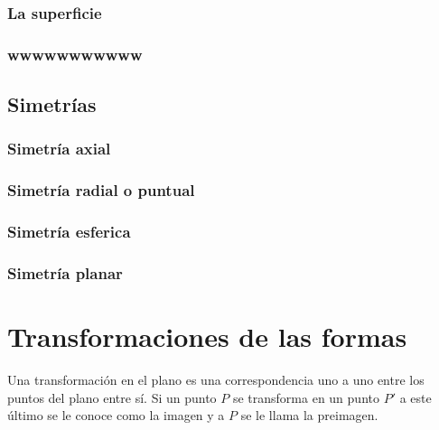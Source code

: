 \documentclass[16pt,]{krantz}
\theoremstyle{definition}
\theoremstyle{definition}
\theoremstyle{definition}
\theoremstyle{definition}
\theoremstyle{remark}
\begin{document}
\hypertarget{la-superficie}{%
\subsection{La superficie}\label{la-superficie}}

\hypertarget{wwwwwwwwwww}{%
\subsection{wwwwwwwwwww}\label{wwwwwwwwwww}}

\hypertarget{simetruxedas}{%
\section{Simetrías}\label{simetruxedas}}

\hypertarget{simetruxeda-axial}{%
\subsection{Simetría axial}\label{simetruxeda-axial}}

\hypertarget{simetruxeda-radial-o-puntual}{%
\subsection{Simetría radial o puntual}\label{simetruxeda-radial-o-puntual}}

\hypertarget{simetruxeda-esferica}{%
\subsection{Simetría esferica}\label{simetruxeda-esferica}}

\hypertarget{simetruxeda-planar}{%
\subsection{Simetría planar}\label{simetruxeda-planar}}

\hypertarget{transformaciones-de-las-formas}{%
\chapter{Transformaciones de las formas}\label{transformaciones-de-las-formas}}

Una transformación en el plano es una correspondencia uno a uno entre los puntos del plano entre sí. Si un punto \(P\) se transforma en un punto \(P'\) a este último se le conoce como la imagen y a \(P\) se le llama la preimagen.
\end{document}
